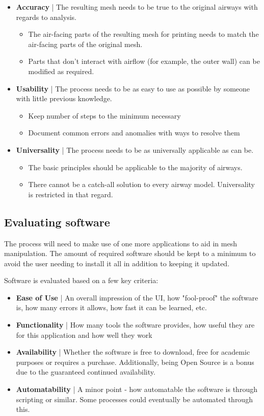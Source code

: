\documentclass[MME,Projekt,english]{twbook}%
\begin{document}
\begin{itemize}
	\item \textbf{Accuracy} | The resulting mesh needs to be true to the original airways with regards to analysis.
	\begin{itemize}
		\item The air-facing parts of the resulting mesh for printing needs to match the air-facing parts of the original mesh.
		\item Parts that don't interact with airflow (for example, the outer wall) can be modified as required.
	\end{itemize}
	\item \textbf{Usability} | The process needs to be as easy to use as possible by someone with little previous knowledge.
	\begin{itemize}
		\item Keep number of steps to the minimum necessary
		\item Document common errors and anomalies with ways to resolve them
	\end{itemize}
	\item \textbf{Universality} | The process needs to be as universally applicable as can be.
	\begin{itemize}
		\item The basic principles should be applicable to the majority of airways.
		\item There cannot be a catch-all solution to every airway model. Universality is restricted in that regard.
	\end{itemize}
\end{itemize}

\subsection{Evaluating software}

The process will need to make use of one more applications to aid in mesh manipulation.
The amount of required software should be kept to a minimum to avoid the user needing to install it all in
addition to keeping it updated.

Software is evaluated based on a few key criteria:
\begin{itemize}
	\item \textbf{Ease of Use} | An overall impression of the UI, how "fool-proof" the software is, how many errors it allows, how fast it can be learned, etc.
	\item \textbf{Functionality} | How many tools the software provides, how useful they are for this application and how well they work
	\item \textbf{Availability} | Whether the software is free to download, free for academic purposes or requires a purchase. Additionally, being Open Source is a bonus due to the guaranteed continued availability.
	\item \textbf{Automatability} | A minor point - how automatable the software is through scripting or similar. Some processes could eventually be automated through this.
\end{itemize}
\end{document}
